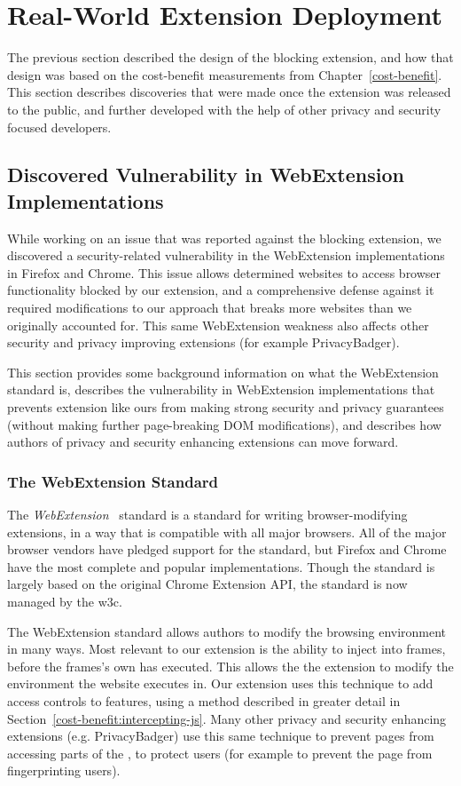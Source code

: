 \section{Real-World Extension Deployment}
\label{current-web:extension-deployment}
The previous section described the design of the \WAPI blocking extension, and
how that design was based on the cost-benefit measurements from
Chapter~\ref{cost-benefit}.  This section describes discoveries that were
made once the extension was released to the public, and further
developed with the help of other privacy and security focused developers.


\subsection{Discovered Vulnerability in WebExtension Implementations}
While working on an issue that was reported against the blocking extension,
we discovered a security-related vulnerability in the WebExtension implementations
in Firefox and Chrome.  This issue allows determined websites to access browser
functionality blocked by our extension, and a comprehensive defense against
it required modifications to our approach that breaks more websites than
we originally accounted for.  This same WebExtension weakness also affects
other security and privacy improving extensions (for example PrivacyBadger).

This section provides some background information on what the WebExtension
standard is, describes the vulnerability in WebExtension implementations that
prevents extension like ours from making strong security and privacy guarantees
(without making further page-breaking DOM modifications), and describes how
authors of privacy and security enhancing extensions can move forward.


\subsubsection{The WebExtension Standard}
The \textit{WebExtension}~\cite{webext2018standard} standard is a standard
for writing browser-modifying extensions, in a way that is compatible
with all major browsers.  All of the major browser vendors have pledged
support for the standard, but Firefox and Chrome have the most complete
and popular implementations.  Though the standard is largely based on
the original Chrome Extension API, the standard is now managed by the \gls{w3c}.

The WebExtension standard allows authors to modify the browsing environment
in many ways.  Most relevant to our extension is the ability to inject
\JS into frames, before the frames's own \JS has executed.  This allows the
the extension to modify the environment the website executes in.  Our extension
uses this technique to add access controls to \WAPI features, using a method
described in greater detail in Section~\ref{cost-benefit:intercepting-js}.
Many other privacy and security enhancing extensions (e.g. PrivacyBadger) use
this same technique to prevent pages from accessing parts of the \WAPI, to
protect users (for example to prevent the page from fingerprinting users).


